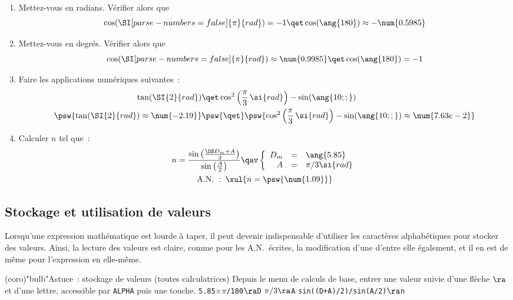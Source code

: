 \documentclass[a4paper, 12pt, garamond]{book}
\begin{document}
\begin{enumerate}
	\item Mettez-vous en radians. Vérifier alors que
	      \[
		      \cos(\SI[parse-numbers=false]{\pi}{rad}) = -1
		      \qet
		      \cos(\ang{180}) \approx -\num{0.5985}
	      \]
	\item Mettez-vous en degrés. Vérifier alors que
	      \[
		      \cos(\SI[parse-numbers=false]{\pi}{rad}) \approx \num{0.9985}
		      \qet
		      \cos(\ang{180}) = -1
	      \]
	\item Faire les applications numériques suivantes~:
	      \begin{align*}
		      \tan(\SI{2}{rad})
		       & \qet
		      \cos^2\left(\frac{\pi}{3}\,\si{rad}\right) -\sin(\ang{10;;})
		      \\
		      \psw{
			      \tan(\SI{2}{rad}) \approx \num{-2.19}
		      }
		       & \psw{\qet}
		      \psw{
			      \cos^2\left(\frac{\pi}{3}\,\si{rad}\right) -\sin(\ang{10;;}) \approx
			      \num{7.63e-2}
		      }
	      \end{align*}
	\item Calculer $n$ tel que~:
	      \vspace{-20pt}
	      \begin{gather*}
		      n =
		      \frac{\sin\left(\frac{\DS D_m+A}{2}\right)}{\sin\left(\frac{A}{2}\right)}
		      \qav
		      \left\{
		      \begin{array}{rcl}
			      D_m & = & \ang{5.85}
			      \\
			      A   & = & \pi/3 \si{rad}
		      \end{array}
		      \right.\\
		      \mathrm{A.N.~:}\enskip
		      \xul{
			      n = \psw{ \num{1.09} }
		      }
	      \end{gather*}
\end{enumerate}

\subsection{Stockage et utilisation de valeurs}
Lorsqu'une expression mathématique est lourde à taper, il peut devenir
indispensable d'utiliser les caractères alphabétiques pour stocker des valeurs.
Ainsi, la lecture des valeurs est claire, comme pour les A.N.\ écrites, la
modification d'une d'entre elle également, et il en est de même pour
l'expression en elle-même.

\begin{tcn}[sidebyside](coro)"bulb"{Astuce~: stockage de valeurs (toutes
	calculatrices)}
	Depuis le menu de calculs de base, entrer une valeur suivie d'une flèche $\ra$
	et d'une lettre, accessible par \texttt{ALPHA} puis une touche.
	\tcblower
	\texttt{\num{5.85}$\times \pi$/180$\ra$D}
	\smallbreak
	\texttt{$\pi/3\ra$A}
	\smallbreak
	\texttt{sin((D+A)/2)/sin(A/2)$\ra$n}
\end{tcn}
\end{document}
